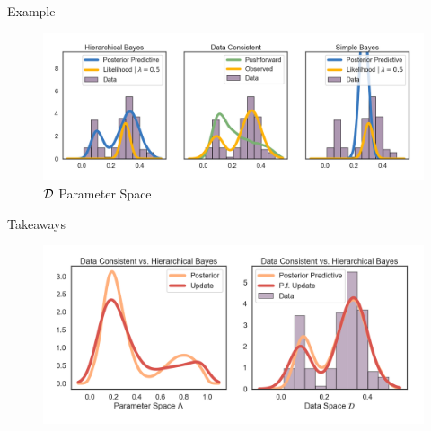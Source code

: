\begin{block}{Example}
\begin{figure}
        \includegraphics[width=32cm]{figures/distr_EX_data_space.png}
        \vspace{-2.05cm}
        \centering
        \caption{$\mathcal{D}$ Parameter Space  }
\end{figure}


\end{block}


\vspace{-1.5cm}


\begin{block}{Takeaways}

\centering
\vspace{-1.5cm}
\begin{figure}
        \includegraphics[width=35cm]{figures/distr_EX_comparison.png}
        \vspace{-0.5cm}
        \caption{ }
    \end{figure}
\end{block}
